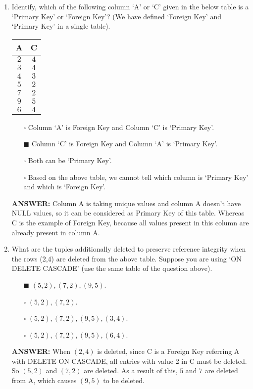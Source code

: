 \documentclass[10pt]{article}
\newcommand{\lightrule}{%
	\arrayrulecolor{black!30}%
	\midrule[\lightrulewidth]%
	\arrayrulecolor{black}}
\begin{document}
\begin{enumerate}
		\item Identify, which of the following column ‘A’ or ‘C’ given in the below table is a ‘Primary Key’ or ‘Foreign Key’? (We have defined ‘Foreign Key’ and ‘Primary Key’ in a single table).
			\begin{center}
				\centering
				\begin{tabular}{@{} *{2}{c} @{}}
					\toprule
						\textbf{A} & \textbf{C} \\
					\midrule
						$2$ & $4$  \\ 
					\lightrule
						$3$ & $4$  \\  
					\lightrule
						$4$ & $3$  \\
					\lightrule 
						$5$ & $2$  \\ 
					\lightrule 
						$7$ & $2$  \\ 
					\lightrule 
						$9$ & $5$  \\ 
					\lightrule 
						$6$ & $4$  \\
					\bottomrule
				\end{tabular}
			\end{center}

			\begin{enumerate}
				\item[$\square$] Column ‘A’ is Foreign Key and Column ‘C’ is ‘Primary Key’.
				\item[$\blacksquare$] Column ‘C’ is Foreign Key and Column ‘A’ is ‘Primary Key’.
				\item[$\square$] Both can be ‘Primary Key’.
				\item[$\square$] Based on the above table, we cannot tell which column is ‘Primary Key’ and which is ‘Foreign Key’.
			\end{enumerate}
			\color{red} \textbf{ANSWER:} \color{black} Column A is taking unique values and column A doesn’t have NULL values, so it can be considered as Primary Key of this table. Whereas C is the example of Foreign Key, because all values present in this column are already present in column A.

		\item What are the tuples additionally deleted to preserve reference integrity when the rows (2,4) are deleted from the above table. Suppose you are using ‘ON DELETE CASCADE’ (use the same table of the question above).
			\begin{enumerate}
				\item[$\blacksquare$] $(5,2), (7,2), (9,5)$.
				\item[$\square$] $(5,2), (7,2)$.
				\item[$\square$] $(5,2), (7,2), (9,5), (3,4)$.
				\item[$\square$] $(5,2), (7,2),(9,5), (6,4)$.
			\end{enumerate}
			\color{red} \textbf{ANSWER:} \color{black} When $(2,4)$ is deleted, since C is a Foreign Key referring A with DELETE ON CASCADE, all entries with value 2 in C must be deleted. So $(5,2)$ and $(7,2)$ are deleted. As a result of this, $5$ and $7$ are deleted from A, which causes $(9, 5)$ to be deleted.
		

\end{enumerate}
\end{document}
